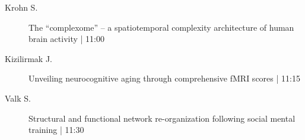 \begin{symposium}
\begin{description}
                \item [ Krohn S.] The “complexome” – a spatiotemporal complexity architecture of human brain activity \textcolor{mygray}{ | 11:00}    
                
                \item [ Kizilirmak J.] Unveiling neurocognitive aging through comprehensive fMRI scores \textcolor{mygray}{ | 11:15}    
                
                \item [ Valk S.] Structural and functional network re-organization following social mental training \textcolor{mygray}{ | 11:30}    
                
            \end{description} 
            \end{symposium}
            